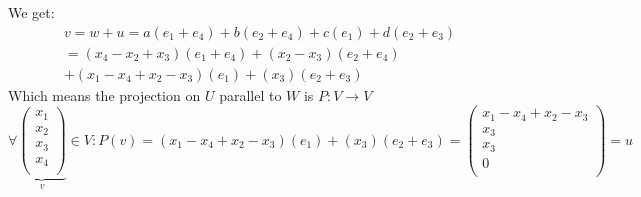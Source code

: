\documentclass[11pt, a4paper]{article}
\begin{document}
\begin{solution}
\begin{enumerate}
\[  \]
  We get:
  \begin{multline*}
    v = w + u = a(e_1+e_4) + b(e_2+e_4) + c(e_1) + d(e_2+e_3) \\
      = (x_4-x_2+x_3)(e_1+e_4) + (x_2-x_3)(e_2+e_4) \\ +
         (x_1 - x_4 + x_2 - x_3)(e_1) + (x_3)(e_2+e_3)
  \end{multline*}
  Which means the projection on $U$ parallel to $W$ is $P\colon V\to V$
  \[
    \forall\underbrace{
    \begin{pmatrix}
  x_1\\
  x_2\\
  x_3\\
  x_4\\
    \end{pmatrix}}_v
    \in V \colon P(v) = (x_1 - x_4 + x_2 - x_3)(e_1) + (x_3)(e_2+e_3) = 
    \begin{pmatrix}
  x_1 - x_4 + x_2 - x_3\\
  x_3\\
  x_3\\
  0\\
    \end{pmatrix} = u
  \]
\end{enumerate}
\end{solution}
\end{document}
